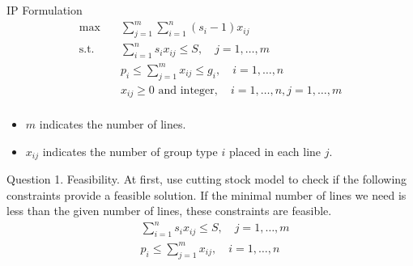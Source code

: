     \begin{frame}{IP Formulation}
      \[\begin{split}\mbox{max}\quad & \sum_{j=1}^{m} \sum_{i=1}^n (s_i-1) x_{ij} \\
      \mbox{s.t.} \quad & \sum_{i=1}^n s_i x_{ij} \leq S, \quad j=1,\ldots,m \\
      & p_i \leq \sum_{j=1}^{m} x_{ij} \leq g_i ,\quad i=1,\ldots,n \\
      & x_{ij} \geq 0 \mbox{ and integer}, \quad i=1,\ldots,n, j=1,\ldots,m \\\end{split}\]
      \begin{itemize}
        \item $m$ indicates the number of lines.
        \item $x_{ij}$ indicates the number of group type $i$ placed in each line $j$.
      \end{itemize}
    \end{frame}

    \begin{frame}{Question}
        1. Feasibility. At first, use cutting stock model to check if the following constraints provide a feasible solution. If the minimal number of lines we need is less than the given number of lines, these constraints are feasible.
        \[\begin{split}
        & \sum_{i=1}^n s_i x_{ij} \leq S, \quad j=1,\ldots,m \\
        & p_i \leq \sum_{j=1}^{m} x_{ij},\quad i=1,\ldots,n
        \end{split}\]

    \end{frame}


